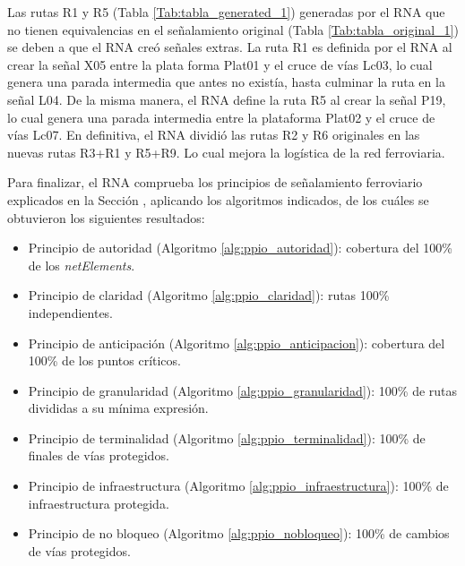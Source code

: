     Las rutas R1 y R5 (Tabla \ref{Tab:tabla_generated_1}) generadas por el RNA que no tienen equivalencias en el señalamiento original (Tabla \ref{Tab:tabla_original_1}) se deben a que el RNA creó señales extras. La ruta R1 es definida por el RNA al crear la señal X05 entre la plata forma Plat01 y el cruce de vías Lc03, lo cual genera una parada intermedia que antes no existía, hasta culminar la ruta en la señal L04. De la misma manera, el RNA define la ruta R5 al crear la señal P19, lo cual genera una parada intermedia entre la plataforma Plat02 y el cruce de vías Lc07. En definitiva, el RNA dividió las rutas R2 y R6 originales en las nuevas rutas R3+R1 y R5+R9. Lo cual mejora la logística de la red ferroviaria.
    
    Para finalizar, el RNA comprueba los principios de señalamiento ferroviario explicados en la Sección \label{sec:validar_principios}, aplicando los algoritmos indicados, de los cuáles se obtuvieron los siguientes resultados:
    
    \begin{itemize}
    	\item Principio de autoridad (Algoritmo \ref{alg:ppio_autoridad}): cobertura del 100\% de los \textit{netElements}.
    	\item Principio de claridad (Algoritmo \ref{alg:ppio_claridad}): rutas 100\% independientes.
    	\item Principio de anticipación (Algoritmo \ref{alg:ppio_anticipacion}): cobertura del 100\% de los puntos críticos.
    	\item Principio de granularidad (Algoritmo \ref{alg:ppio_granularidad}): 100\% de rutas divididas a su mínima expresión.
    	\item Principio de terminalidad (Algoritmo \ref{alg:ppio_terminalidad}): 100\% de finales de vías protegidos.
    	\item Principio de infraestructura (Algoritmo \ref{alg:ppio_infraestructura}): 100\% de infraestructura protegida.
    	\item Principio de no bloqueo (Algoritmo \ref{alg:ppio_nobloqueo}): 100\% de cambios de vías protegidos.
    \end{itemize}	